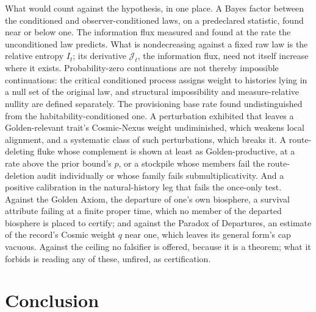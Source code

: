 What would count against the hypothesis, in one place. A Bayes factor
between the conditioned and observer-conditioned laws, on a predeclared
statistic, found near or below one. The information flux measured and
found at the rate the unconditioned law predicts. What is nondecreasing against a fixed raw law is the relative entropy $I_t$; its derivative $\mathcal{J}_t$, the information flux, need not itself increase where it exists. Probability-zero continuations are not thereby impossible continuations: the critical conditioned process assigns weight to histories lying in a null set of the original law, and structural impossibility and measure-relative nullity are defined separately. The provisioning base
rate found undistinguished from the habitability-conditioned one. A
perturbation exhibited that leaves a Golden-relevant trait's Cosmic-Nexus
weight undiminished, which weakens local alignment, and a systematic class
of such perturbations, which breaks it. A route-deleting fluke whose
complement is shown at least as Golden-productive, at a rate above the
prior bound's $p$, or a stockpile whose members fail the route-deletion
audit individually or whose family fails submultiplicativity. And a
positive calibration in the natural-history leg that fails the once-only
test. Against the Golden Axiom, the departure of one's own biosphere, a
survival attribute failing at a finite proper time, which no member of
the departed biosphere is placed to certify; and against the Paradox of
Departures, an estimate of the record's Cosmic weight $q$ near one, which
leaves its general form's cap vacuous. Against the ceiling no falsifier is offered, because it is a
theorem; what it forbids is reading any of these, unfired, as
certification.

\section{Conclusion}\label{sec:conclusion}

